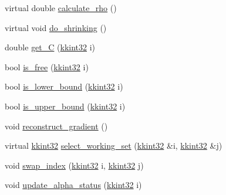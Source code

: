 \begin{DoxyCompactItemize}
\item 
virtual double \hyperlink{class_s_v_m289___b_f_s_1_1_solver_a1f3ea071aca939d28d180319700d670d}{calculate\+\_\+rho} ()
\item 
virtual void \hyperlink{class_s_v_m289___b_f_s_1_1_solver_ad3f6665a1ca590e56b3d51f8ddcc347c}{do\+\_\+shrinking} ()
\item 
double \hyperlink{class_s_v_m289___b_f_s_1_1_solver_a207ebe1089dcbb412f5695db3c1a80b2}{get\+\_\+C} (\hyperlink{namespace_k_k_b_a8fa4952cc84fda1de4bec1fbdd8d5b1b}{kkint32} i)
\item 
bool \hyperlink{class_s_v_m289___b_f_s_1_1_solver_ae739ebfc6478ecda42abcbb52cceca3d}{is\+\_\+free} (\hyperlink{namespace_k_k_b_a8fa4952cc84fda1de4bec1fbdd8d5b1b}{kkint32} i)
\item 
bool \hyperlink{class_s_v_m289___b_f_s_1_1_solver_abb89db252806f790b5e9e19f609518ca}{is\+\_\+lower\+\_\+bound} (\hyperlink{namespace_k_k_b_a8fa4952cc84fda1de4bec1fbdd8d5b1b}{kkint32} i)
\item 
bool \hyperlink{class_s_v_m289___b_f_s_1_1_solver_a1bdbc9dfa56364a34b927beac631d125}{is\+\_\+upper\+\_\+bound} (\hyperlink{namespace_k_k_b_a8fa4952cc84fda1de4bec1fbdd8d5b1b}{kkint32} i)
\item 
void \hyperlink{class_s_v_m289___b_f_s_1_1_solver_a611bdb15d4f6024c3c8a30c4753231c3}{reconstruct\+\_\+gradient} ()
\item 
virtual \hyperlink{namespace_k_k_b_a8fa4952cc84fda1de4bec1fbdd8d5b1b}{kkint32} \hyperlink{class_s_v_m289___b_f_s_1_1_solver_a02d734cc0d91b19a56ca047b73d0ea51}{select\+\_\+working\+\_\+set} (\hyperlink{namespace_k_k_b_a8fa4952cc84fda1de4bec1fbdd8d5b1b}{kkint32} \&i, \hyperlink{namespace_k_k_b_a8fa4952cc84fda1de4bec1fbdd8d5b1b}{kkint32} \&j)
\item 
void \hyperlink{class_s_v_m289___b_f_s_1_1_solver_acd490f87c1408e87a47255792212f780}{swap\+\_\+index} (\hyperlink{namespace_k_k_b_a8fa4952cc84fda1de4bec1fbdd8d5b1b}{kkint32} i, \hyperlink{namespace_k_k_b_a8fa4952cc84fda1de4bec1fbdd8d5b1b}{kkint32} j)
\item 
void \hyperlink{class_s_v_m289___b_f_s_1_1_solver_ab0cc95a78b498383fc52e0ea8df34a3c}{update\+\_\+alpha\+\_\+status} (\hyperlink{namespace_k_k_b_a8fa4952cc84fda1de4bec1fbdd8d5b1b}{kkint32} i)
\end{DoxyCompactItemize}
